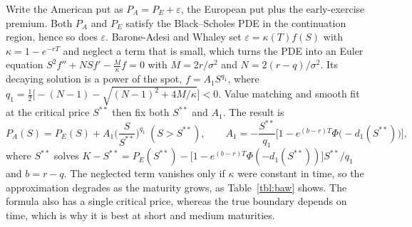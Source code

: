 Write the American put as $P_A=P_E+\varepsilon$, the European put plus the early-exercise premium.
Both $P_A$ and $P_E$ satisfy the Black--Scholes PDE in the continuation region, hence so does $\varepsilon$.
Barone-Adesi and Whaley set $\varepsilon=\kappa(T)f(S)$ with $\kappa=1-e^{-rT}$ and neglect a term that is small, which turns the PDE into an Euler equation $S^2f''+NSf'-\frac{M}{\kappa}f=0$ with $M=2r/\sigma^2$ and $N=2(r-q)/\sigma^2$.
Its decaying solution is a power of the spot, $f=A_1S^{q_1}$, where $q_1=\tfrac12\big[-(N-1)-\sqrt{(N-1)^2+4M/\kappa}\big]<0$.
Value matching and smooth fit at the critical price $S^{**}$ then fix both $S^{**}$ and $A_1$.
The result is
\begin{equation}
P_A(S)=P_E(S)+A_1\Big(\frac S{S^{**}}\Big)^{q_1}\ (S>S^{**}),\qquad A_1=-\frac{S^{**}}{q_1}\Big[1-e^{(b-r)T}\Phi\big(-d_1(S^{**})\big)\Big],
\end{equation}
where $S^{**}$ solves $K-S^{**}=P_E(S^{**})-\big[1-e^{(b-r)T}\Phi(-d_1(S^{**}))\big]S^{**}/q_1$ and $b=r-q$.
The neglected term vanishes only if $\kappa$ were constant in time, so the approximation degrades as the maturity grows, as Table~\ref{tbl:baw} shows.
The formula also has a single critical price, whereas the true boundary depends on time, which is why it is best at short and medium maturities.
